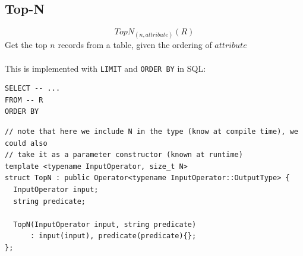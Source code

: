 \subsection{Top-N}
\[TopN_{(n, attribute)}(R)\]
Get the top $n$ records from a table, given the ordering of $attribute$
\\
\\ This is implemented with \texttt{LIMIT} and \texttt{ORDER BY} in SQL:
\begin{verbatim}
SELECT -- ...
FROM -- R
ORDER BY 
\end{verbatim}

\begin{verbatim}
// note that here we include N in the type (know at compile time), we could also
// take it as a parameter constructor (known at runtime)
template <typename InputOperator, size_t N>
struct TopN : public Operator<typename InputOperator::OutputType> {
  InputOperator input;
  string predicate;

  TopN(InputOperator input, string predicate)
      : input(input), predicate(predicate){};
};
\end{verbatim}


